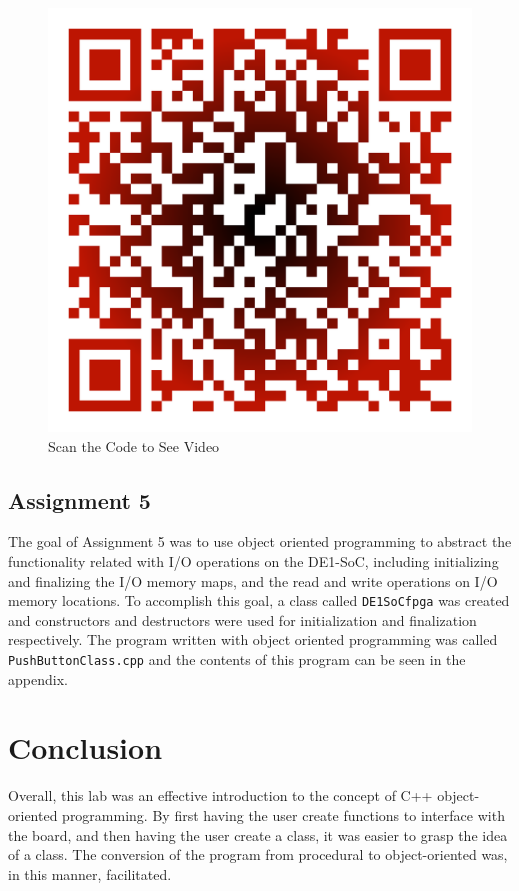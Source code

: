 \documentclass[
	letterpaper, %
	10pt, %
]{CSUniSchoolLabReport}
\begin{document}
\begin{figure}[h!]
  \centering
  \includegraphics[width=.75\textwidth]{Figures/QR.png}
  \caption{Scan the Code to See Video}
  \label{fig:1}
\end{figure}

\subsection{Assignment 5}

The goal of Assignment 5 was to use object oriented programming to abstract the functionality related with I/O operations on the DE1-SoC, including initializing and finalizing the I/O memory maps, and the read and write operations on I/O memory locations. To accomplish this goal, a class called \texttt{DE1SoCfpga} was created and constructors and destructors were used for initialization and finalization respectively. The program written with object oriented programming was called \texttt{PushButtonClass.cpp} and the contents of this program can be seen in the appendix. 

\section{Conclusion}

Overall, this lab was an effective introduction to the concept of C++ object-oriented programming. By first having the user create functions to interface with the board, and then having the user create a class, it was easier to grasp the idea of a class. The conversion of the program from procedural to object-oriented was, in this manner, facilitated.
\end{document}
